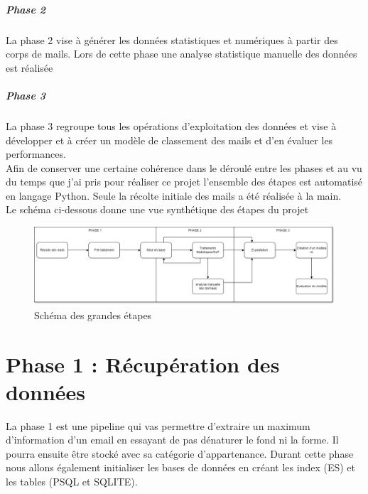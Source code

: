 \documentclass[a4paper,12pt]{article}
\begin{document}
	\subparagraph{Phase 2} La phase 2 vise à générer les données statistiques et numériques à partir des corps de mails. Lors de cette phase une analyse statistique manuelle des données est réalisée
	
	\subparagraph{Phase 3} La phase 3 regroupe tous les opérations d'exploitation des données et vise à développer et à créer un modèle de classement des mails et d'en évaluer les performances.\\
	
	Afin de conserver une certaine cohérence dans le déroulé entre les phases et au vu du temps que j'ai pris pour réaliser ce projet l'ensemble des étapes est automatisé en langage Python. Seule la récolte initiale des mails a été réalisée à la main.\\
	
	Le schéma ci-dessous donne une vue synthétique des étapes du projet
	\begin{figure}[H]
		\includegraphics[width=\linewidth]{img/SchemaGeneral.jpg}
		\caption{Schéma des grandes étapes}
	\end{figure}
		 
\newpage

\section{Phase 1 : Récupération des données}
	La phase 1 est une pipeline qui vas permettre d'extraire un maximum d'information d'un email en essayant de pas dénaturer le fond ni la forme. Il pourra ensuite être stocké avec sa catégorie d'appartenance. Durant cette phase nous allons également initialiser les bases de données en créant les index (ES) et les tables (PSQL et SQLITE). 
	
\end{document}
